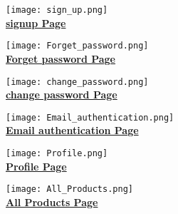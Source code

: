 \documentclass[12pt,a4paper]{report}
\begin{document}
		\begin{center}
			\texttt{[image: sign\_up.png]}
			\\
			\textbf{\underline{signup Page}}
		\end{center}
						
		\begin{center}
			\texttt{[image: Forget\_password.png]}
			\\
			\textbf{\underline{Forget password Page}}
		\end{center}
				  
		\begin{center}
			\texttt{[image: change\_password.png]}
			\\
			\textbf{\underline{change password Page}}
		\end{center}
						           
		\begin{center}
			\texttt{[image: Email\_authentication.png]}
			\\
			\textbf{\underline{Email authentication Page}}
		\end{center}
						  
		\begin{center}
			\texttt{[image: Profile.png]}
			\\
			\textbf{\underline{Profile Page}}
		\end{center}
				
		\begin{center}
			\texttt{[image: All\_Products.png]}
			\\
			\textbf{\underline{All Products Page}}
		\end{center}
				
\end{document}
